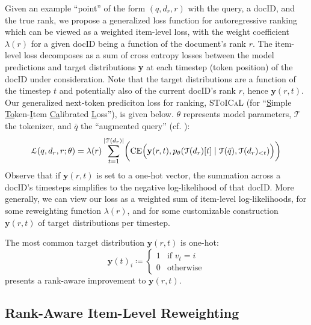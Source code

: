 \documentclass[11pt, a4paper, onecolumn, confidential, copyright, gdm]{google}
\begin{document}
Given an example ``point'' of the form $(q, d_r, r)$ with the query, a docID, and the true rank, we propose a generalized loss function for autoregressive ranking which can be viewed as a weighted item-level loss, with the weight coefficient $\lambda(r)$ for a given docID being a function of the document's rank $r$. The item-level loss decomposes as a sum of cross entropy losses between the model predictions and target distributions \textbf{y} at each timestep (token position) of the docID under consideration. Note that the target distributions are a function of the timestep $t$ and potentially also of the current docID's rank $r$, hence $\mathbf{y}(r, t)$. Our generalized next-token prediciton loss for ranking, \textsc{SToICaL} (for ``\underline{S}imple \underline{To}ken-\underline{I}tem \underline{Ca}librated \underline{L}oss''), is given below. $\theta$ represents model parameters, $\mathcal{T}$ the tokenizer, and $\bar{q}$ the ``augmented query'' (cf. ):
\begin{equation}\label{eq:general-loss-formulation}
\mathcal{L}(q, d_r, r; \theta) = \lambda(r) \sum_{t=1}^{|\mathcal{T}(d_r)|} \biggl(\operatorname{CE}\Bigl(\mathbf{y}(r, t), p_\theta(\mathcal{T}(d_r)[t] \mid \mathcal{T}(\bar{q}), \mathcal{T}(d_r)_{<t})\Bigr) \biggr)
\end{equation}
\noindent Observe that if $\mathbf{y}(r,t)$ is set to a one-hot vector, the summation across a docID's timesteps simplifies to the negative log-likelihood of that docID. More generally, we can view our loss as a weighted sum of item-level log-likelihoods, for some reweighting function $\lambda(r)$, and for some customizable construction $\mathbf{y}(r,t)$ of target distributions per timestep.

The most common target distribution $\mathbf{y}(r, t)$ is one-hot:
\begin{equation}
\mathbf{y}(t)_i \coloneqq \begin{cases}
    1 & \text{if } v_t = i \\
    0 & \text{otherwise}
\end{cases}
\end{equation}
\noindent {} presents a rank-aware improvement to $\mathbf{y}(r,t)$.

\subsection{Rank-Aware Item-Level Reweighting}\label{sec:rank-aware-item-level-reweighting}
\end{document}
